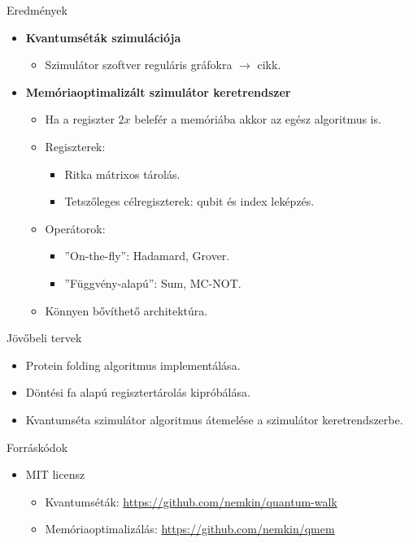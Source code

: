 \documentclass[aspectratio=169]{beamer}
\begin{document}
\begin{frame}{Eredmények}

\begin{itemize}
    \item \textbf{Kvantumséták szimulációja}
    \begin{itemize}
    \item Szimulátor szoftver reguláris gráfokra $\rightarrow$ cikk.
    \end{itemize}
    \item \textbf{Memóriaoptimalizált szimulátor keretrendszer}
    \begin{itemize}
    \item Ha a regiszter $2x$ belefér a memóriába akkor az egész algoritmus is.
    \item Regiszterek:
    \begin{itemize}
      \item Ritka mátrixos tárolás.
      \item Tetszőleges célregiszterek: qubit és index leképzés.
    \end{itemize}
    \item Operátorok:
    \begin{itemize}
      \item ''On-the-fly'': Hadamard, Grover.
      \item ''Függvény-alapú'': Sum, MC-NOT.
    \end{itemize}
    \item Könnyen bővíthető architektúra.
    \end{itemize}
\end{itemize}
\end{frame}

\begin{frame}{Jövőbeli tervek}

\begin{itemize}
    \item Protein folding algoritmus implementálása.
    \item Döntési fa alapú regisztertárolás kipróbálása.
    \item Kvantumséta szimulátor algoritmus átemelése a szimulátor keretrendszerbe.
\end{itemize}

\end{frame}

\begin{frame}{Forráskódok}

\begin{itemize}
\item MIT licensz
\begin{itemize}
\item Kvantumséták: \href{https://github.com/nemkin/quantum-walk}{\color{blue}https://github.com/nemkin/quantum-walk}
\item Memóriaoptimalizálás: \href{https://github.com/nemkin/qmem}{\color{blue}https://github.com/nemkin/qmem}
\end{itemize}
\end{itemize}
\end{frame}
\end{document}
